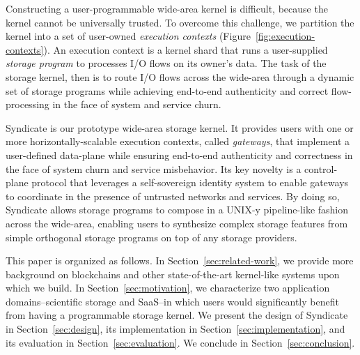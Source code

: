 Constructing a user-programmable wide-area kernel is difficult, because the kernel cannot be
universally trusted.  To overcome this challenge, we partition the kernel into a
set of user-owned \textit{execution contexts}
(Figure~\ref{fig:execution-contexts}).  An execution context is a
kernel shard that runs a user-supplied \textit{storage program} to processes I/O
flows on its owner's data.  The task of the storage kernel, then is to 
route I/O flows across the wide-area 
through a dynamic set of storage programs
while achieving end-to-end authenticity and correct flow-processing in the face
of system and service churn.

Syndicate is our prototype wide-area storage kernel.  It provides 
users with one or more horizontally-scalable execution contexts, called
\textit{gateways}, that implement a user-defined data-plane while ensuring
end-to-end authenticity and correctness in the face of system churn and service
misbehavior.  Its key novelty is a control-plane protocol
that leverages a self-sovereign identity system to enable gateways to coordinate in
the presence of untrusted networks and services.  By doing so, Syndicate allows
storage programs to compose in a UNIX-y pipeline-like fashion across the wide-area,
enabling users to synthesize complex storage features from simple
orthogonal storage programs on top of any storage providers.

This paper is organized as follows.  In Section~\ref{sec:related-work}, we
provide more background on blockchains and other state-of-the-art kernel-like systems upon
which we build.  In Section~\ref{sec:motivation}, we characterize two
application domains--scientific storage and SaaS--in which users would
significantly benefit from having a programmable storage kernel.  We present the
design of Syndicate in Section~\ref{sec:design}, its implementation in
Section~\ref{sec:implementation}, and its evaluation in
Section~\ref{sec:evaluation}.  We conclude in Section~\ref{sec:conclusion}.
